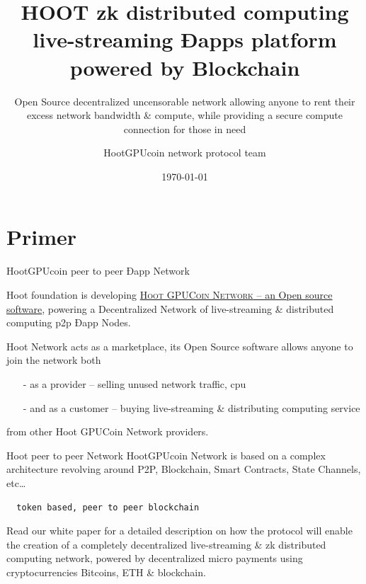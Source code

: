 \documentclass[10pt]{beamer}
\title{HOOT zk distributed computing live-streaming Ðapps platform powered by Blockchain}
\subtitle{Open Source decentralized uncensorable network allowing anyone to rent their excess network bandwidth \& compute, while providing a secure compute connection for those in need}
\date{\today}
\author{HootGPUcoin network protocol team}
\institute{HootGPUcoin Foundation}
\newcommand{\themename}{\textbf{\textsc{metropolis}}\xspace}
\begin{document}
\maketitle


\section{Primer}

\begin{frame}[fragile]{HootGPUcoin peer to peer Ðapp Network }

 Hoot foundation is developing \href{https://onhoot.com/tokensale}{\textsc{Hoot GPUCoin Network} – an Open source software}, powering a Decentralized Network of live-streaming \& distributed computing p2p Ðapp Nodes.
 

Hoot Network acts as a marketplace, its Open Source software allows anyone to join the network both 

\begin{itemize}
\item[-]as a provider – selling unused network traffic, cpu
\item[-]and as a customer – buying live-streaming \& distributing computing service
\end{itemize}
 from other Hoot GPUCoin Network providers. 
\end{frame}
\begin{frame}[fragile]{Hoot peer to peer Network }
 HootGPUcoin Network is based on a complex architecture revolving around P2P, Blockchain, Smart Contracts, State Channels, etc\ldots
 \begin{verbatim} 
  token based, peer to peer blockchain 
 \end{verbatim}
 
 Read our white paper for a detailed description on how the protocol will enable the creation of a completely decentralized live-streaming \& zk distributed computing network, powered by decentralized micro payments using cryptocurrencies Bitcoins, ETH \& blockchain. 


\end{frame}
\end{document}
